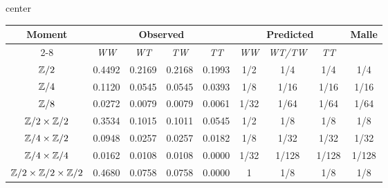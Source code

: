 \documentclass[11pt,a4paper]{amsart}
\def\Z{{\rm \mathbb{Z}}}
\numberwithin{equation}{section}
\begin{document}
\begin{adjustbox}{center}
\begin{tabular}{|c|c||c||c||c|c||c||c|c|}\hline
\multirow{2}{*}{\textbf{Moment}} & \multicolumn{4}{c|}{\textbf{Observed}} & \multicolumn{3}{c|}{\textbf{Predicted}} & \multirow{2}{*}{\textbf{Malle}} \\ \cline{2-8}
& \textit{WW} & \textit{WT} & \textit{TW} & \textit{TT} & \textit{WW} & \textit{WT/TW} & \textit{TT} & \\ \hline
$\Z/2$ & 0.4492 & 0.2169 & 0.2168 & 0.1993 & \cellcolor{lightgray} 1/2 &  1/4 &  1/4 & 1/4 \\ \hline 
$\Z/4$ & 0.1120 & 0.0545 & 0.0545 & 0.0393 & 1/8 & 1/16 & 1/16 & 1/16 \\ \hline
$\Z/8$ & 0.0272 & 0.0079 & 0.0079 & 0.0061 & 1/32 & 1/64 & 1/64 & 1/64 \\ \hline
$\Z/2 \times \Z/2$ & 0.3534 & 0.1015 & 0.1011 & 0.0545 & \cellcolor{lightgray} 1/2 &   1/8 &  1/8 & 1/8 \\ \hline
$\Z/4 \times \Z/2$ & 0.0948 & 0.0257 & 0.0257 & 0.0182 & 1/8 & 1/32 & 1/32 & 1/32 \\ \hline
$\Z/4 \times \Z/4$ & 0.0162 & 0.0108 & 0.0108 & 0.0000 & 1/32 & 1/128 & 1/128 & 1/128 \\ \hline
$\Z/2 \times \Z/2 \times \Z/2$ & 0.4680 & 0.0758 & 0.0758 & 0.0000 & \cellcolor{lightgray} 1 &  1/8 &
 1/8 & 1/8 \\ \hline
\end{tabular}
\end{adjustbox}






 
 
\end{document}
